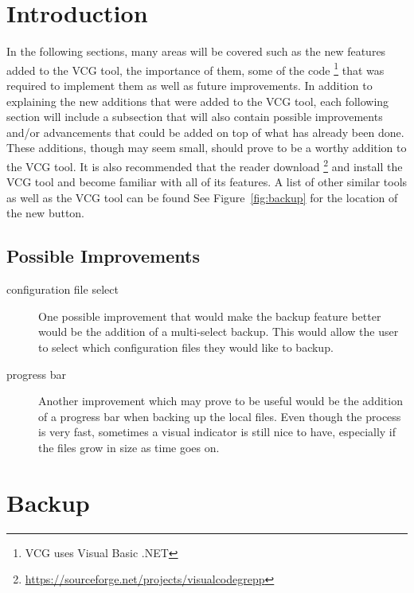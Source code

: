 \documentclass[letterpaper,twocolumn,10pt]{article}
\begin{document}
\section{Introduction}

In the following sections, many areas will be covered such as the new features added to the VCG tool, the importance of them, some of the code%
\footnote{VCG uses Visual Basic .NET} that was required to implement them as well as future improvements. In addition to explaining the new additions that were added to the VCG tool, each following section will include a subsection that will also contain possible improvements and/or advancements that could be added on top of what has already been done. These additions, though may seem small, should prove to be a worthy addition to the VCG tool. It is also recommended that the reader download%
\footnote{\url{https://sourceforge.net/projects/visualcodegrepp}} and install the VCG tool and become familiar with all of its features. A list of other similar tools as well as the VCG tool can be found See Figure~\ref{fig:backup} for the location of the new button.

\subsection{Possible Improvements}
\begin{description}
\item[configuration file select] One possible improvement that would make the backup feature better would be the addition of a multi-select backup. This would allow the user to select which configuration files they would like to backup. 
\item[progress bar] Another improvement which may prove to be useful would be the addition of a progress bar when backing up the local files. Even though the process is very fast, sometimes a visual indicator is still nice to have, especially if the files grow in size as time goes on.

\end{description}

\section{Backup}
\end{document}
